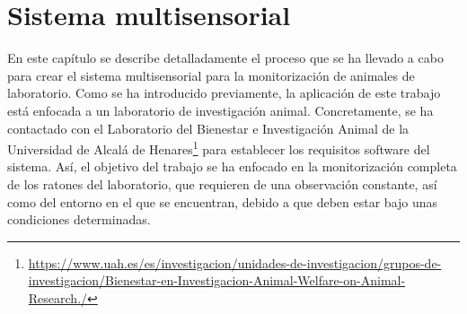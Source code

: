 \chapter{Sistema multisensorial }
\label{cap:capitulo4}



\vspace{1cm}
En este capítulo se describe detalladamente el proceso que se ha llevado a cabo para crear el sistema multisensorial para la monitorización de animales de laboratorio. Como se ha introducido previamente, la aplicación de este trabajo está enfocada a un laboratorio de investigación animal. Concretamente, se ha contactado con el Laboratorio del Bienestar e Investigación Animal de la Universidad de Alcalá de Henares\footnote{\url{https://www.uah.es/es/investigacion/unidades-de-investigacion/grupos-de-investigacion/Bienestar-en-Investigacion-Animal-Welfare-on-Animal-Research./}} para establecer los requisitos software del sistema. Así, el objetivo del trabajo se ha enfocado en la monitorización completa de los ratones del laboratorio, que requieren de una observación constante, así como del entorno en el que se encuentran, debido a que deben estar bajo unas condiciones determinadas.\\

